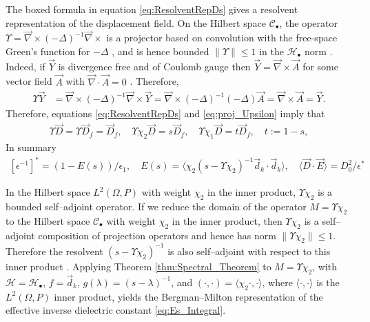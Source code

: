 \documentclass[english,12pt]{ttuthes}
\begin{document}
%
The boxed formula in equation \eqref{eq:ResolventRepDs} gives a
resolvent representation of the displacement field. On the Hilbert
space $\mathscr{C}_{\bullet}$, the operator $\Upsilon=\vec{\nabla}\times(-\Delta)^{-1}\vec{\nabla}\times$ is
a projector based on convolution with the free-space Green's function
for $-\Delta$ \cite{Golden:CMP-473}, and is hence bounded $\|\Upsilon\|\leq1$ in the
$\mathscr{H}_{\bullet}$ norm \cite{Folland:95}. Indeed, if $\vec{Y}$ 
is divergence free and of Coulomb gauge then 
$\vec{Y}=\vec{\nabla}\times\vec{A}$ for some vector field $\vec{A}$ with
$\vec{\nabla}\cdot\vec{A}=0$ \cite{Griffiths-1999,Jackson-1999}. Therefore, 
% 
\begin{align}\label{eq:proj_Upsilon}
  \Upsilon\vec{Y}&=\vec{\nabla}\times(-\Delta)^{-1}\vec{\nabla}\times\vec{Y}
              =\vec{\nabla}\times(-\Delta)^{-1}(-\Delta)\vec{A}=\vec{\nabla}\times\vec{A}
              =\vec{Y}.
\end{align}
%
Therefore, equations \eqref{eq:ResolventRepDs} and
\eqref{eq:proj_Upsilon} imply that
%
\begin{align}
  \Upsilon\vec{D}=\Upsilon\vec{D}_f=\vec{D}_f, \quad
  \Upsilon\chi_2\vec{D}=s\vec{D}_f, \quad
  \Upsilon\chi_1\vec{D}=t\vec{D}_f, \quad
  t:=1-s,
\end{align}
%
In summary
%
\begin{align}\label{eq:Herglotz_Energy_Rep_Ds}
  [\epsilon^{-1}]^*=(1-E(s))/\epsilon_1,\quad
  E(s)=\langle\chi_2(s-\Upsilon\chi_2)^{-1}\vec{d}_k\cdot\vec{d}_k\rangle, \quad
  \langle\vec{D}\cdot\vec{E}\rangle=D_0^2/\epsilon^*
\end{align}
%

In the Hilbert space $L^2(\Omega,P)$ with weight $\chi_2$ in the
inner product, $\Upsilon\chi_2$ is a bounded self--adjoint operator. If we
reduce the domain of the operator $M=\Upsilon\chi_2$ to the Hilbert space 
$\mathscr{C}_{\bullet}$ with weight $\chi_2$ in the inner product, then $\Upsilon\chi_2$
is a self--adjoint composition of projection operators and hence has
norm $\|\Upsilon\chi_2\|\leq1$. Therefore the resolvent $(s-\Upsilon\chi_2)^{-1}$ is also
self--adjoint with respect to this inner product \cite{Stone:64}.
Applying Theorem \ref{thm:Spectral_Theorem} to $M=\Upsilon\chi_2$, with
$\mathscr{H}=\mathscr{H}_\bullet$, $f=\vec{d}_k$, 
$g(\lambda)=(s-\lambda)^{-1}$, and $(\cdot,\cdot)=\langle\chi_2\cdot,\cdot\rangle$, where $\langle\cdot,\cdot\rangle$ is the
$L^2(\Omega,P)$ inner product, yields the Bergman--Milton representation of
the effective inverse dielectric constant \eqref{eq:Es_Integral}. 
\end{document}

